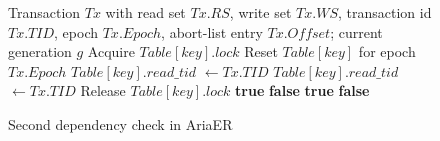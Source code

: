 \documentclass[english,preprint,JIP]{ipsj}
\begin{document}
\begin{figure}[!t]
\begin{algorithm}[H]
    \caption{Second dependency check in AriaER}
    \label{alg2}
    \begin{algorithmic}[1]  
    \Require Transaction $Tx$ with read set $Tx.RS$, write set $Tx.WS$, transaction id $Tx.TID$, epoch $Tx.Epoch$, abort-list entry $Tx.Offset$; current generation $g$
                \State Acquire $\textit{Table}[key].lock$
                    \State Reset $\textit{Table}[key]$ for epoch $Tx.Epoch$
                    \State $\textit{Table}[key].read\_tid$ $\gets Tx.TID$
                    \State $\textit{Table}[key].read\_tid$ $\gets Tx.TID$
                \EndIf
                \State Release $\textit{Table}[key].lock$
            \EndFor
        \EndFunction
        \State
                    \State \Return \textbf{true}
                \EndIf
            \EndFor
            \State \Return \textbf{false}
        \EndFunction
        \State
                    \State \Return \textbf{true}
                \EndIf
            \EndFor
            \State \Return \textbf{false}
        \EndFunction
    \end{algorithmic}
\end{algorithm}
\end{figure}
\end{document}
